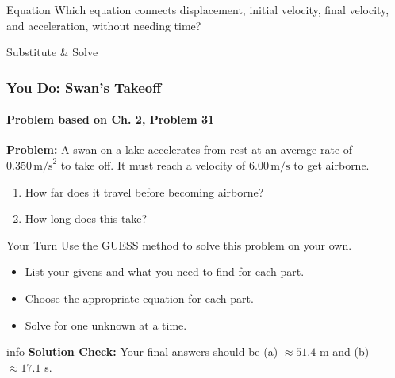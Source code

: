 \documentclass{beamer}
\begin{document}
\begin{frame}

\begin{alertblock}{Equation}
    Which equation connects displacement, initial velocity, final velocity, and acceleration, without needing time?
\end{alertblock}
\begin{alertblock}{Substitute \& Solve}
\end{alertblock}
\end{frame}

\begin{frame}
\frametitle{You Do: Swan's Takeoff}
\framesubtitle{Problem based on Ch. 2, Problem 31}
\textbf{Problem:} A swan on a lake accelerates from rest at an average rate of $0.350 \, \text{m/s}^2$ to take off. It must reach a velocity of $6.00 \, \text{m/s}$ to get airborne.
\begin{enumerate}
    \item How far does it travel before becoming airborne?
    \item How long does this take?
\end{enumerate}

\begin{block}{Your Turn}
    Use the GUESS method to solve this problem on your own.
    \begin{itemize}
        \item List your givens and what you need to find for each part.
        \item Choose the appropriate equation for each part.
        \item Solve for one unknown at a time.
    \end{itemize}
\end{block}

\pause

\begin{beamercolorbox}[rounded=true,shadow=true]{info}
\centering
\textbf{Solution Check:} Your final answers should be (a) $\approx 51.4$ m and (b) $\approx 17.1$ s.
\end{beamercolorbox}

\end{frame}
\end{document}
